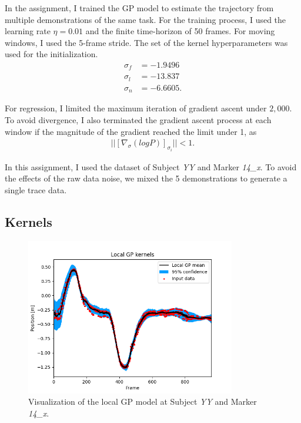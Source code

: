 \documentclass[conference]{IEEEtran}
\begin{document}
In the assignment, I trained the GP model to estimate the trajectory from multiple demonstrations of the same task. 
For the training process, I used the learning rate $\eta=0.01$ and the finite time-horizon of 50 frames. 
For moving windows, I used the 5-frame stride.
The set of the kernel hyperparameters was used for the initialization.
\begin{equation}
\begin{aligned}
\sigma_f &= -1.9496\\
\sigma_l &= -13.837\\
\sigma_n &= -6.6605.
\end{aligned}
\end{equation}

For regression, I limited the maximum iteration of gradient ascent under $2,000$.
To avoid divergence, I also terminated the gradient ascent process at each window if the magnitude of the gradient reached the limit under 1, as
\begin{equation}
\begin{aligned}
	|| \left[ {\nabla}_\sigma (log P) \right]_{\sigma_i}  || < 1.
	\label{eq:gradient ascent}
\end{aligned}
\end{equation}

In this assignment, I used the dataset of Subject \textit{YY} and Marker \textit{14\_x}.
To avoid the effects of the raw data noise, we mixed the 5 demonstrations to generate a single trace data.

\subsection{Kernels}

\begin{figure}[!t]
	\centering
	\includegraphics[width=3.6in]{local.png}	
	\caption{Visualization of the local GP model at Subject \textit{YY} and Marker \textit{14\_x}.}
	\label{fig:local}
\end{figure}
\end{document}
